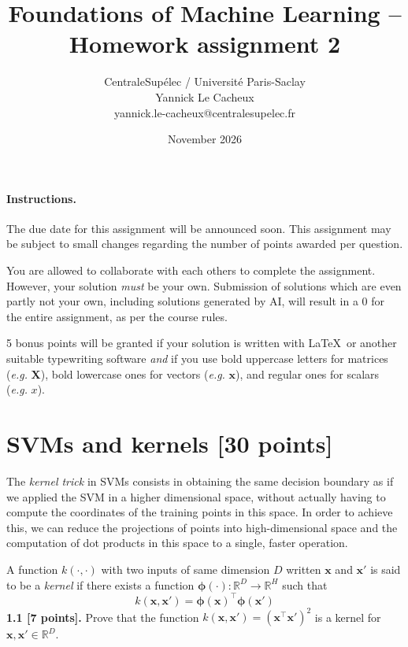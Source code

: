 \documentclass{article}
\title{Foundations of Machine Learning -- Homework assignment 2}
\author{CentraleSupélec / Université Paris-Saclay 
\\ Yannick Le Cacheux
\\ yannick.le-cacheux@centralesupelec.fr}
\date{November 2026}
\begin{document}
\maketitle

\paragraph{Instructions.}
The due date for this assignment will be announced soon.
This assignment may be subject to small changes regarding the number of points awarded per question.

You are allowed to collaborate with each others to complete the assignment.
However, your solution \emph{must} be your own.
Submission of solutions which are even partly not your own, including solutions generated by AI, will result in a 0 for the entire assignment, as per the course rules.

5 bonus points will be granted if your solution is written with \LaTeX~or another suitable typewriting software \emph{and} if you use bold uppercase letters for matrices (\textit{e.g.} $\mathbf{X}$), bold lowercase ones for vectors (\textit{e.g.} $\mathbf{x}$), and regular ones for scalars (\textit{e.g.} $x$).

\section{SVMs and kernels [30 points]}

The \textit{kernel trick} in SVMs consists in obtaining the same decision boundary as if we applied the SVM in a higher dimensional space, without actually having to compute the coordinates of the training points in this space. In order to achieve this, we can reduce the projections of points into high-dimensional space and the computation of dot products in this space to a single, faster operation.

A function $k(\cdot, \cdot)$ with two inputs of same dimension $D$ written $\mathbf{x}$ and $\mathbf{x}'$ is said to be a \textit{kernel} if there exists a function $\boldsymbol{\phi}(\cdot): \mathbb{R}^D \rightarrow \mathbb{R}^H$ such that
\begin{equation}
k(\mathbf{x}, \mathbf{x}') = \boldsymbol{\phi}(\mathbf{x})^\top \boldsymbol{\phi}(\mathbf{x}')
\end{equation}
\noindent\textbf{1.1 [7 points].} Prove that the function $k(\mathbf{x}, \mathbf{x}') = (\mathbf{x}^\top\mathbf{x}')^2$ is a kernel for $\mathbf{x},\mathbf{x}' \in \mathbb{R}^D$.
\end{document}
